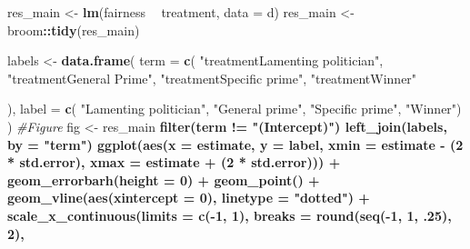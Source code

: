 \documentclass[]{book}
\newenvironment{Shaded}{\begin{snugshade}}{\end{snugshade}}
\newcommand{\KeywordTok}[1]{\textcolor[rgb]{0.13,0.29,0.53}{\textbf{#1}}}
\newcommand{\DataTypeTok}[1]{\textcolor[rgb]{0.13,0.29,0.53}{#1}}
\newcommand{\DecValTok}[1]{\textcolor[rgb]{0.00,0.00,0.81}{#1}}
\newcommand{\StringTok}[1]{\textcolor[rgb]{0.31,0.60,0.02}{#1}}
\newcommand{\CommentTok}[1]{\textcolor[rgb]{0.56,0.35,0.01}{\textit{#1}}}
\newcommand{\OperatorTok}[1]{\textcolor[rgb]{0.81,0.36,0.00}{\textbf{#1}}}
\newcommand{\NormalTok}[1]{#1}
\begin{document}
\begin{Shaded}
\begin{Highlighting}[]
\NormalTok{res_main <-}\StringTok{  }\KeywordTok{lm}\NormalTok{(fairness }\OperatorTok{~}\StringTok{ }\NormalTok{treatment, }\DataTypeTok{data =}\NormalTok{ d) }
\NormalTok{res_main <-}\StringTok{ }\NormalTok{broom}\OperatorTok{::}\KeywordTok{tidy}\NormalTok{(res_main)}

\NormalTok{labels <-}\StringTok{ }\KeywordTok{data.frame}\NormalTok{(}
  \DataTypeTok{term =} \KeywordTok{c}\NormalTok{(}
    \StringTok{"treatmentLamenting politician"}\NormalTok{,}
    \StringTok{"treatmentGeneral Prime"}\NormalTok{,}
    \StringTok{"treatmentSpecific prime"}\NormalTok{,}
    \StringTok{"treatmentWinner"}
    
\NormalTok{  ),}
  \DataTypeTok{label =} \KeywordTok{c}\NormalTok{( }\StringTok{"Lamenting politician"}\NormalTok{,}
             \StringTok{"General prime"}\NormalTok{,}
             \StringTok{"Specific prime"}\NormalTok{,}
             \StringTok{"Winner"}\NormalTok{)}
\NormalTok{)}
\CommentTok{#Figure}
\NormalTok{fig <-}\StringTok{   }\NormalTok{res_main }\OperatorTok{%>%}
\StringTok{  }\KeywordTok{filter}\NormalTok{(term }\OperatorTok{!=}\StringTok{ "(Intercept)"}\NormalTok{) }\OperatorTok{%>%}\StringTok{ }
\StringTok{  }\KeywordTok{left_join}\NormalTok{(labels, }\DataTypeTok{by =} \StringTok{"term"}\NormalTok{) }\OperatorTok{%>%}\StringTok{ }
\StringTok{  }
\StringTok{  }\KeywordTok{ggplot}\NormalTok{(}\KeywordTok{aes}\NormalTok{(}\DataTypeTok{x =}\NormalTok{ estimate, }\DataTypeTok{y =}\NormalTok{ label,}
             \DataTypeTok{xmin =}\NormalTok{ estimate }\OperatorTok{-}\StringTok{ }\NormalTok{(}\DecValTok{2} \OperatorTok{*}\StringTok{ }\NormalTok{std.error),}
             \DataTypeTok{xmax =}\NormalTok{ estimate }\OperatorTok{+}\StringTok{ }\NormalTok{(}\DecValTok{2} \OperatorTok{*}\StringTok{ }\NormalTok{std.error))) }\OperatorTok{+}
\StringTok{   }\KeywordTok{geom_errorbarh}\NormalTok{(}\DataTypeTok{height =} \DecValTok{0}\NormalTok{) }\OperatorTok{+}
\StringTok{  }\KeywordTok{geom_point}\NormalTok{() }\OperatorTok{+}
\StringTok{  }\KeywordTok{geom_vline}\NormalTok{(}\KeywordTok{aes}\NormalTok{(}\DataTypeTok{xintercept =} \DecValTok{0}\NormalTok{), }\DataTypeTok{linetype =} \StringTok{"dotted"}\NormalTok{) }\OperatorTok{+}
\StringTok{  }\KeywordTok{scale_x_continuous}\NormalTok{(}\DataTypeTok{limits =} \KeywordTok{c}\NormalTok{(}\OperatorTok{-}\DecValTok{1}\NormalTok{, }\DecValTok{1}\NormalTok{),}
                     \DataTypeTok{breaks =} \KeywordTok{round}\NormalTok{(}\KeywordTok{seq}\NormalTok{(}\OperatorTok{-}\DecValTok{1}\NormalTok{, }\DecValTok{1}\NormalTok{, .}\DecValTok{25}\NormalTok{), }\DecValTok{2}\NormalTok{),}
}}}
\end{Highlighting}
\end{Shaded}
\end{document}
